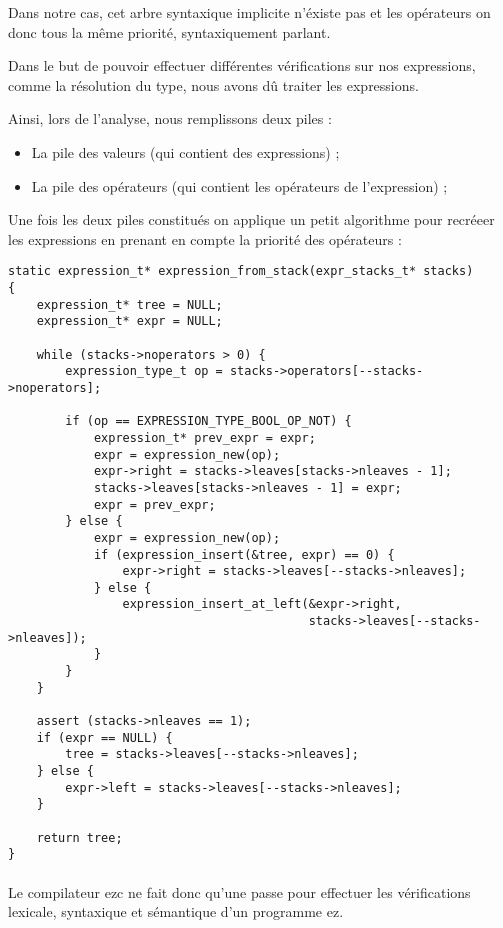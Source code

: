 Dans notre cas, cet arbre syntaxique implicite n'éxiste pas et les opérateurs 
on donc tous la même priorité, syntaxiquement parlant.

Dans le but de pouvoir effectuer différentes vérifications sur nos expressions, 
comme la résolution du type, nous avons dû traiter les expressions.

Ainsi, lors de l'analyse, nous remplissons deux piles :
\begin{itemize}
    \item La pile des valeurs (qui contient des expressions) ;
    \item La pile des opérateurs (qui contient les opérateurs de l'expression) ;
\end{itemize}

Une fois les deux piles constitués on applique un petit algorithme pour recréeer
les expressions en prenant en compte la priorité des opérateurs :
\begin{verbatim}
static expression_t* expression_from_stack(expr_stacks_t* stacks)
{
    expression_t* tree = NULL;
    expression_t* expr = NULL;

    while (stacks->noperators > 0) {
        expression_type_t op = stacks->operators[--stacks->noperators];

        if (op == EXPRESSION_TYPE_BOOL_OP_NOT) {
            expression_t* prev_expr = expr;
            expr = expression_new(op);
            expr->right = stacks->leaves[stacks->nleaves - 1];
            stacks->leaves[stacks->nleaves - 1] = expr;
            expr = prev_expr;
        } else {
            expr = expression_new(op);
            if (expression_insert(&tree, expr) == 0) {
                expr->right = stacks->leaves[--stacks->nleaves];
            } else {
                expression_insert_at_left(&expr->right,
                                          stacks->leaves[--stacks->nleaves]);
            }
        }
    }

    assert (stacks->nleaves == 1);
    if (expr == NULL) {
        tree = stacks->leaves[--stacks->nleaves];
    } else {
        expr->left = stacks->leaves[--stacks->nleaves];
    }

    return tree;
}
\end{verbatim}

\paragraph{}Le compilateur ezc ne fait donc qu'une passe pour effectuer les 
vérifications lexicale, syntaxique et sémantique d'un programme ez.

